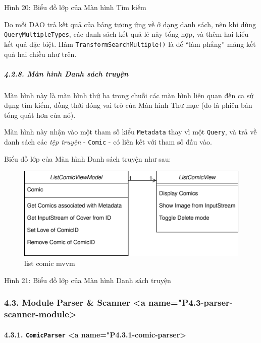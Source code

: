 \documentclass[
]{article}
\begin{document}
Hình 20: Biểu đồ lớp của Màn hình Tìm kiếm

Do mỗi DAO trả kết quả của bảng tương ứng về ở dạng danh sách, nên khi
dùng \texttt{QueryMultipleTypes}, các danh sách kết quả lẻ này tổng hợp,
và thêm hai kiểu kết quả đặc biệt. Hàm
\texttt{TransformSearchMultiple()} là để ``làm phẳng'' mảng kết quả hai
chiều như trên.

\hypertarget{muxe0n-huxecnh-danh-suxe1ch-truyux1ec7n}{%
\subparagraph{\texorpdfstring{4.2.8. Màn hình Danh sách truyện
}{4.2.8. Màn hình Danh sách truyện }}\label{muxe0n-huxecnh-danh-suxe1ch-truyux1ec7n}}

Màn hình này là màn hình thứ ba trong chuỗi các màn hình liên quan đến
ca sử dụng tìm kiếm, đồng thời đóng vai trò của Màn hình Thư mục (do là
phiên bản tổng quát hơn của nó).

Màn hình này nhận vào một tham số kiểu \texttt{Metadata} thay vì một
\texttt{Query}, và trả về danh sách các \emph{tệp truyện} -
\texttt{Comic} - có liên kết với tham số đầu vào.

Biểu đồ lớp của Màn hình Danh sách truyện như sau:

\begin{figure}
\centering
\includegraphics{../images/list_comics_mvvm_class.svg}
\caption{list comic mvvm}
\end{figure}

Hình 21: Biểu đồ lớp của Màn hình Danh sách truyện

\hypertarget{module-parser-scanner-a-namep4.3-parser-scanner-module}{%
\subsubsection{4.3. Module Parser \& Scanner \textless a
name="P4.3-parser-scanner-module\textgreater{}}\label{module-parser-scanner-a-namep4.3-parser-scanner-module}}

\hypertarget{comicparser-a-namep4.3.1-comic-parser}{%
\paragraph{\texorpdfstring{4.3.1. \texttt{ComicParser} \textless a
name="P4.3.1-comic-parser\textgreater{}}{4.3.1. ComicParser \textless a name="P4.3.1-comic-parser\textgreater{}}}\label{comicparser-a-namep4.3.1-comic-parser}}
\end{document}
